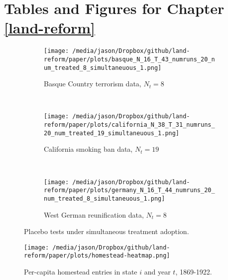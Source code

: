 \chapter{Tables and Figures for Chapter \ref{land-reform}}


\begin{figure}[htbp]
	\centering
	\begin{subfigure}[t]{0.48\textwidth}
		\centering
		\texttt{[image: /media/jason/Dropbox/github/land-reform/paper/plots/basque\_N\_16\_T\_43\_numruns\_20\_num\_treated\_8\_simultaneuous\_1.png]}
		\caption{Basque Country terrorism data, $N_t = 8$} 
	\end{subfigure}
	~ 
	\begin{subfigure}[t]{0.48\textwidth}
		\centering
		\texttt{[image: /media/jason/Dropbox/github/land-reform/paper/plots/california\_N\_38\_T\_31\_numruns\_20\_num\_treated\_19\_simultaneuous\_1.png]}
		\caption{California smoking ban data, $N_t = 19$}
	\end{subfigure}
	~
	\begin{subfigure}[t]{0.48\textwidth}
		\centering
		\texttt{[image: /media/jason/Dropbox/github/land-reform/paper/plots/germany\_N\_16\_T\_44\_numruns\_20\_num\_treated\_8\_simultaneuous\_1.png]}
		\caption{West German reunification data, $N_t = 8$} 
	\end{subfigure}
	\caption{Placebo tests under simultaneous treatment adoption. \label{synth-sim}} 
\end{figure}

\begin{figure}[htbp]
	\begin{center}
		\texttt{[image: /media/jason/Dropbox/github/land-reform/paper/plots/homestead-heatmap.png]}
	\end{center}
	\caption{Per-capita homestead entries in state $i$ and year $t$, 1869-1922. \label{fig:homestead-heatmap}}
\end{figure}

